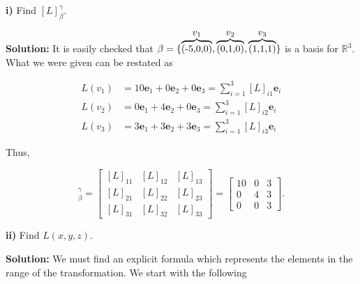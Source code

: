\documentclass[12pt, a4paper]{article}
\begin{document}
 \vspace{2mm}
 
 \textbf{i)} Find $[L]_{\beta}^{\gamma}$.
 
 \vspace{2mm}
 
 \textbf{Solution:} It is easily checked that $\beta=\{\overbrace{\hbox{(-5,0,0)}}^{\hbox{$v_1$}}, \overbrace{\hbox{(0,1,0)}}^{\hbox{$v_2$}}, \overbrace{\hbox{(1,1,1)}}^{\hbox{$v_3$}}\}$ is a basis for $\mathbb{R}^3$. What we were given can be restated as
 
 \begin{equation*}
     \begin{split}
         L(v_1) &= 10\mathbf{e}_1+0\mathbf{e}_2+0\mathbf{e}_3=\sum\limits_{i=1}^3[L]_{i1}\mathbf{e}_i \\
         L(v_2) &= 0\mathbf{e}_1+4\mathbf{e}_2+0\mathbf{e}_3 = \sum\limits_{i=1}^3[L]_{i2}\mathbf{e}_i \\
         L(v_3) &= 3\mathbf{e}_1+3\mathbf{e}_2+3\mathbf{e}_3 = \sum\limits_{i=1}^3[L]_{i3}\mathbf{e}_i
     \end{split}
 \end{equation*}
 
 \vspace{2mm}
 
 \noindent Thus,
 
 \begin{equation*}
     [L]_{\beta}^{\gamma}=\begin{bmatrix} [L]_{11} & [L]_{12} & [L]_{13} \\ [L]_{21} & [L]_{22} & [L]_{23} \\ [L]_{31} & [L]_{32} & [L]_{33} \end{bmatrix} = \begin{bmatrix} 10 & 0 & 3 \\ 0 & 4 & 3 \\ 0 & 0 & 3 \end{bmatrix}.
 \end{equation*}
 
 \vspace{4mm}
 
 \textbf{ii)} Find $L(x,y,z)$.
 
 \vspace{4mm} 
 
 \textbf{Solution:} We must find an explicit formula which represents the elements in the range of the transformation. We start with the following
 
 \newpage
 
\end{document}

